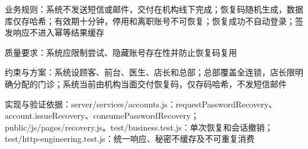 \documentclass[UTF8,12pt,a4paper,fontset=none]{ctexart}
\begin{document}
业务规则：系统不发送短信或邮件，交付在机构线下完成；恢复码随机生成，数据库仅存哈希；有效期十分钟，停用和离职账号不可恢复；恢复成功不自动登录；签发响应不进入幂等结果缓存\par
质量要求：系统应限制尝试、隐藏账号存在性并防止恢复码复用\par
约束与方案：系统设顾客、前台、医生、店长和总部；总部覆盖全连锁，店长限明确分配的门诊；系统当前由机构当面交付恢复码，仅存码哈希，不发短信邮件\par
实现与验证依据：server/\allowbreak{}services/\allowbreak{}accounts.\allowbreak{}js：requestPasswordRecovery、account.\allowbreak{}issueRecovery、consumePasswordRecovery；public/\allowbreak{}js/\allowbreak{}pages/\allowbreak{}recovery.\allowbreak{}js。test/\allowbreak{}business.\allowbreak{}test.\allowbreak{}js：单次恢复和会话撤销；test/\allowbreak{}http-engineering.\allowbreak{}test.\allowbreak{}js：统一响应、秘密不缓存及不可重复消费\par
{}
\end{document}
